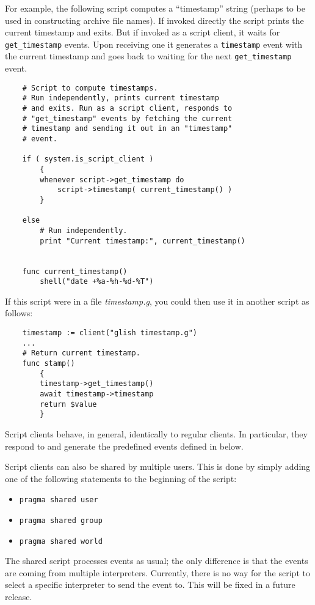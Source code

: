 For example, the following script computes a ``timestamp'' string
(perhaps to be used in constructing archive file names).  If invoked
directly the script prints the current timestamp and exits.  But
if invoked as a script client, it waits for {\tt get\_timestamp} events.
Upon receiving one it generates a {\tt timestamp} event with the current
timestamp and goes back to waiting for the next {\tt get\_timestamp} event.
\begin{verbatim}
    # Script to compute timestamps.
    # Run independently, prints current timestamp
    # and exits. Run as a script client, responds to
    # "get_timestamp" events by fetching the current
    # timestamp and sending it out in an "timestamp"
    # event.

    if ( system.is_script_client )
        {
        whenever script->get_timestamp do
            script->timestamp( current_timestamp() )
        }

    else
        # Run independently.
        print "Current timestamp:", current_timestamp()


    func current_timestamp()
        shell("date +%a-%h-%d-%T")
\end{verbatim}

If this script were in a file {\em timestamp.g\/}, you could then use it
in another script as follows:
\begin{verbatim}
    timestamp := client("glish timestamp.g")
    ...
    # Return current timestamp.
    func stamp()
        {
        timestamp->get_timestamp()
        await timestamp->timestamp
        return $value
        }
\end{verbatim}

Script clients behave, in general, identically to regular clients.  In
particular, they respond to and generate the predefined events defined
in  below.

Script clients can also be shared by multiple users. This is done
by simply adding one of the following statements to the beginning of the
script:
\begin{itemize}
\item \verb+pragma shared user+
\item \verb+pragma shared group+
\item \verb+pragma shared world+
\end{itemize}
The shared script processes events as usual; the only difference is that
the events are coming from multiple interpreters. Currently, there is
no way for the script to select a specific interpreter to send the event
to. This will be fixed in a future release.

